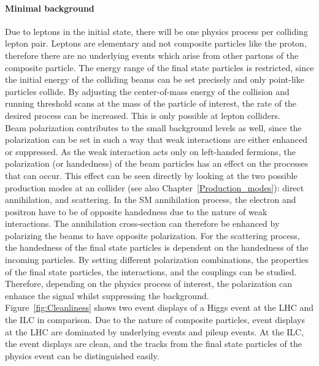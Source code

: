 \paragraph{Minimal background}
Due to leptons in the initial state, there will be one physics process per colliding lepton pair.
Leptons are elementary and not composite particles like the proton, therefore there are no underlying events which arise from other partons of the composite particle.
The energy range of the final state particles is restricted, since the initial energy of the colliding beams can be set precisely and only point-like particles collide.
By adjusting the center-of-mass energy of the collision and running threshold scans at the mass of the particle of interest, the rate of the desired process can be increased.
This is only possible at lepton colliders.
\\Beam polarization contributes to the small background levels as well, since the polarization can be set in such a way that weak interactions are either enhanced or suppressed.
As the weak interaction acts only on left-handed fermions, the polarization (or handedness) of the beam particles has an effect on the processes that can occur.
This effect can be seen directly by looking at the two possible production modes at an \positron\electron collider (see also Chapter~\ref{Production_modes}):
direct \positron\electron annihilation, and \positron\electron scattering.
In the SM annihilation process, the electron and positron have to be of opposite handedness due to the nature of weak interactions.
The annihilation cross-section can therefore be enhanced by polarizing the beams to have opposite polarization.
For the \positron\electron scattering process, the handedness of the final state particles is dependent on the handedness of the incoming particles.
By setting different polarization combinations, the properties of the final state particles, the interactions, and the couplings can be studied. %
Therefore, depending on the physics process of interest, the polarization can enhance the signal whilst suppressing the background. 
\\Figure~\ref{fig:Cleanliness} shows two event displays of a Higgs event at the LHC and the ILC in comparison.
Due to the nature of composite particles, event displays at the LHC are dominated by underlying events and pileup events.
At the ILC, the event displays are clean, and the tracks from the final state particles of the physics event can be distinguished easily.
